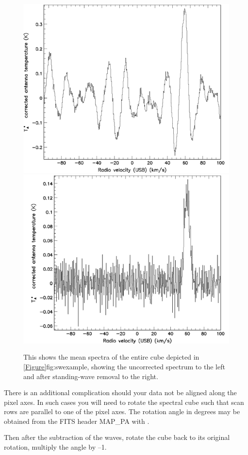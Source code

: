\documentclass[11pt,oneside,chapters]{starlink}
\begin{document}
\begin{figure}[ht!]
\begin{center}
\includegraphics[align=c,width=0.48\linewidth]{sc20_swspectrum_all}
\includegraphics[align=c,width=0.48\linewidth]{sc20_noswspectrum_all}
\caption[The mean spectrum before and after standing waves removal]
{\label{fig:allspectra}
  This shows the mean spectra of the entire cube depicted
  in \cref{Figure}{fig:swexample}{}, showing the uncorrected spectrum
  to the left and after standing-wave removal to the right.}
\end{center}
\end{figure}


There is an additional complication should your data not be aligned
along the pixel axes.  In such cases you will need to rotate the
spectral cube such that scan rows are parallel to one of the pixel
axes.  The rotation angle in degrees may be obtained from the FITS
header MAP\_PA with \fitsval.

\begin{terminalv}
\end{terminalv}

Then after the subtraction of the waves, rotate the cube back to its
original rotation, multiply the angle by --1.

\begin{terminalv}
\end{terminalv}
\end{document}
